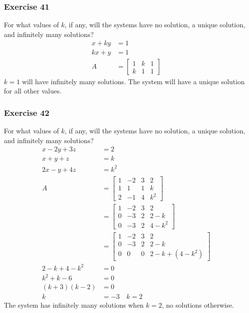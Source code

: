 \documentclass{math}
\begin{document}
\subsubsection*{Exercise 41}
For what values of \( k \), if any, will the systems have no solution, a unique
solution, and infinitely many solutions?
\begin{align*}
  x+ky &= 1 \\
  kx+y &= 1 \\
  A &= \begin{bmatrix}
    1 & k & 1 \\
    k & 1 & 1
  \end{bmatrix}
\end{align*}
\( k = 1 \) will have infinitely many solutions. The system will have a unique
solution for all other values.

\subsubsection*{Exercise 42}
For what values of \( k \), if any, will the systems have no solution, a unique
solution, and infinitely many solutions?
\begin{align*}
  x-2y+3z &= 2 \\
  x+y+z &= k \\
  2x-y+4z &= k^2 \\
  A &= \begin{bmatrix}
    1 & -2 & 3 & 2 \\
    1 & 1 & 1 & k \\
    2 & -1 & 4 & k^2
  \end{bmatrix} \\
  &= \begin{bmatrix}
    1 & -2 & 3 & 2 \\
    0 & -3 & 2 & 2-k \\
    0 & -3 & 2 & 4-k^2
  \end{bmatrix} \\
  &= \begin{bmatrix}
    1 & -2 & 3 & 2 \\
    0 & -3 & 2 & 2-k \\
    0 & 0 & 0 & 2-k+(4-k^2)
  \end{bmatrix} \\
  2-k+4-k^2 &= 0 \\
  k^2+k-6 &= 0 \\
  (k+3)(k-2) &= 0 \\
  k &= -3 \quad k = 2
\end{align*}
The system has infinitely many solutions when \( k = 2 \), no solutions
otherwise.
\end{document}

